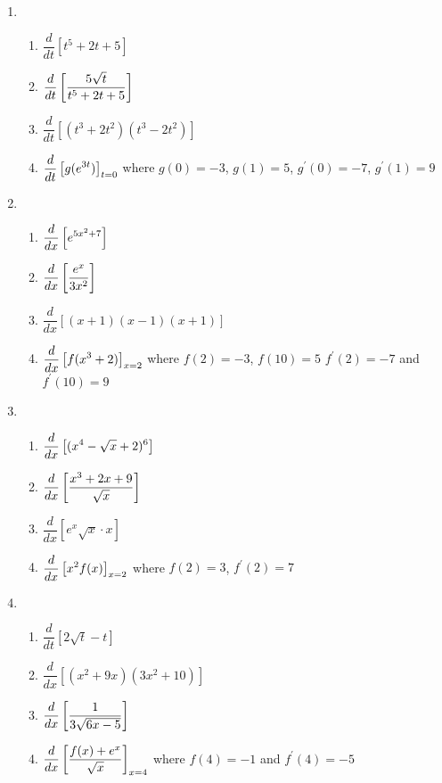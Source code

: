 \documentclass[10pt]{article}
\begin{document}
{{\begin{enumerate}
\item[Board 2.] \,  
    \begin{enumerate}
    \item $\dfrac{d}{dt}[ t^5 + 2t + 5]$
    \item $\displaystyle \dfrac{d}{dt}\left[\frac{5\sqrt{t}}{t^5+2t+5}\right]$
    \item $\dfrac{d}{dt}\left[(t^3 + 2t^2)(t^3 - 2t^2)\right]$
    \item $\displaystyle \dfrac{d}{dt}\left[ g(e^{3t})\right]_{t=0}$  where $g(0)=-3$, $g(1)=5$, $g^{\prime}(0)= -7$, $g^{\prime}(1)= 9$ 
    \end{enumerate}
\newpage

\item[Board 3.] \,  
    \begin{enumerate}
    \item $\displaystyle \dfrac{d}{dx}\left[e^{5x^2+7}\right]$
    \item $\displaystyle \dfrac{d}{dx}\left[\frac{e^x}{3x^2}\right]$
    \item $\dfrac{d}{dx}\left[(x + 1)(x - 1)(x+1)\right]$
    \item $\displaystyle \frac{d}{dx} \left[ f(x^3+2) \right]_{x=2}$ where $f(2)=-3$, $f(10)=5$ $f^{\prime}(2)=-7$ and $f^{\prime}(10)=9$
    \end{enumerate}
    \newpage 
    
\item[Board 4.] \,  
    \begin{enumerate}

\item $\displaystyle \frac{d}{dx}\left[(x^4-\sqrt{x}+2)^6 \right]$
    \item $\displaystyle \dfrac{d}{dx}\left[\frac{x^3+2x+9}{\sqrt{x}}\right]$
    \item $\dfrac{d}{dx}\left[e^x \sqrt{x}\cdot x\right]$
        \item $\displaystyle \dfrac{d}{dx}\left[x^2f(x) \right]_{x=2}$ where $f(2)=3$, $f^{\prime}(2)=7$
    \end{enumerate}
    \newpage
    
\item[Board 5.] \,  
    \begin{enumerate}
            \item $\dfrac{d}{dt}[2\sqrt{t}-t]$
    \item $\dfrac{d}{dx}[(x^2 + 9x)(3x^2+10)]$
    \item $\displaystyle \dfrac{d}{dx}\left[\frac{1}{3\sqrt{6x-5}}\right]$
        \item $\displaystyle \dfrac{d}{dx}\left[\frac{f(x) + e^x}{\sqrt{x}}\right]_{x=4}$ where $f(4)=-1$ and $f^{\prime}(4)=-5$
    \end{enumerate}
\newpage


\end{enumerate}}}
\end{document}
